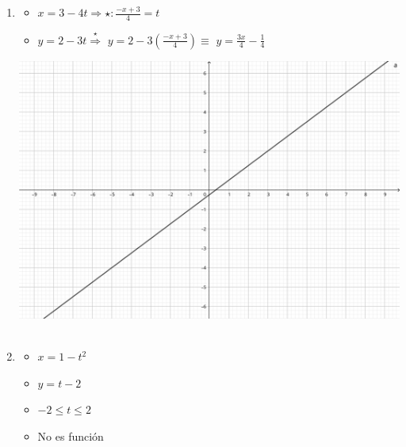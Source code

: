 \documentclass[../practica_02.tex]{subfiles}
\begin{document}
    \begin{enumerate}
        \item 
            \begin{itemize}
                \item $x = 3-4t \Rightarrow \star: \frac{-x+3}{4} = t$
                \item $y = 2-3t \stackrel{\star}{\Rightarrow} $
                        $ y = 2 - 3(\frac{-x+3}{4}) \equiv $
                        $ y = \frac{3x}{4} - \frac{1}{4} $
            \end{itemize}

            \includegraphics[scale=0.2]{ej01/resources/ej01a.png} $ $
        \item 
            \begin{itemize}
                \item $x = 1-t^2$
                \item $y = t-2$
                \item $-2 \leq t \leq 2$
                \item No es función
            \end{itemize}


\end{enumerate}
\end{document}
